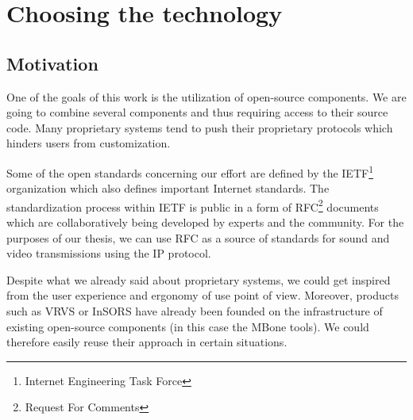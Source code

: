 
\chapter{Choosing the technology}\label{kap:VyberTechnologie}

\section{Motivation}

One of the goals of this work is the utilization of open-source components.
We are going to combine several components and thus requiring access to their source code.
Many proprietary systems tend to push their proprietary protocols which hinders users from customization.

Some of the open standards concerning our effort are defined by the IETF\footnote{Internet Engineering Task Force} organization which also defines important Internet standards. The standardization process within IETF is public in a form of RFC\footnote{Request For Comments} documents which are collaboratively being developed by experts and the community. For the purposes of our thesis, we can use RFC as a source of standards for sound and video transmissions using the IP protocol.

Despite what we already said about proprietary systems, we could get inspired from the user experience and ergonomy of use point of view. Moreover, products such as VRVS \cite{VRVS-SK-Manual} or InSORS have already been founded on the infrastructure of existing open-source components (in this case the MBone tools). We could therefore easily reuse their approach in certain situations.

